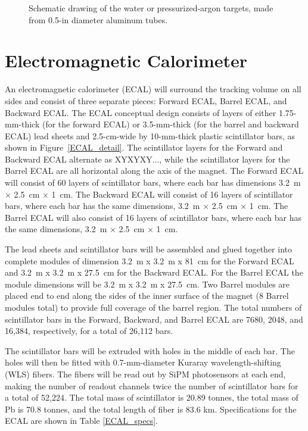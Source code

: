 \begin{figure}
\begin{center}
\caption[Schematic drawing of the water or pressurized-argon targets]{\label{STT_targets} Schematic drawing of the water or pressurized-argon targets, 
made from 0.5-in diameter aluminum tubes.}
\end{center}
\end{figure}

\section{Electromagnetic Calorimeter}

An electromagnetic calorimeter 
(ECAL) will surround the tracking volume on all sides and consist of three separate pieces: Forward ECAL, Barrel ECAL, and Backward ECAL. 
The ECAL conceptual design 
consists of 
layers of either 1.75-mm-thick (for the forward ECAL) or 3.5-mm-thick 
(for the barrel and backward ECAL) lead sheets and 2.5-cm-wide by 10-mm-thick 
plastic scintillator bars,
as shown in Figure~\ref{ECAL_detail}. The scintillator layers for the
Forward and Backward ECAL alternate as XYXYXY..., while the scintillator 
layers for the Barrel ECAL are all horizontal along the axis of the magnet.
The Forward ECAL will consist of 60 layers of scintillator bars, where each
bar has dimensions 3.2~m $\times$ 2.5~cm $\times$ 1~cm. The
Backward ECAL will consist of 16 layers of scintillator bars, where each 
bar has the same dimensions, 3.2~m $\times$ 2.5~cm $\times$ 1~cm. The Barrel ECAL will also consist 
of 16 layers of scintillator bars, where each bar has the same dimensions, 
3.2~m $\times$ 2.5~cm $\times$ 1~cm. 

The lead sheets and scintillator bars will be assembled and glued together
into complete modules of dimension 3.2~m x 3.2~m x 81~cm for the Forward ECAL and
3.2~m x 3.2~m x 27.5~cm for the Backward ECAL. For the Barrel ECAL the module 
dimensions will be 3.2~m x 3.2~m x 27.5~cm. Two Barrel modules are placed end to
end along the sides of the inner surface of the magnet (8 Barrel modules
total) to provide full coverage of the barrel region.
The total numbers of scintillator bars in the
Forward, Backward, and Barrel ECAL are 7680, 2048, and 16,384, respectively, 
for a total of 26,112 bars. 

The scintillator bars will be extruded with 
holes in the middle of each bar. The
holes will then be fitted with 0.7-mm-diameter Kuraray wavelength-shifting (WLS) fibers.
The fibers will be read out by SiPM photosensors at each end, making the number of 
readout channels twice the number of scintillator bars 
for a total of 52,224. The total mass of scintillator is 20.89 tonnes, 
the total mass of Pb is 70.8 tonnes, and
the total length of fiber is 83.6 km.
Specifications for the ECAL are shown in Table \ref{ECAL_specs}.

